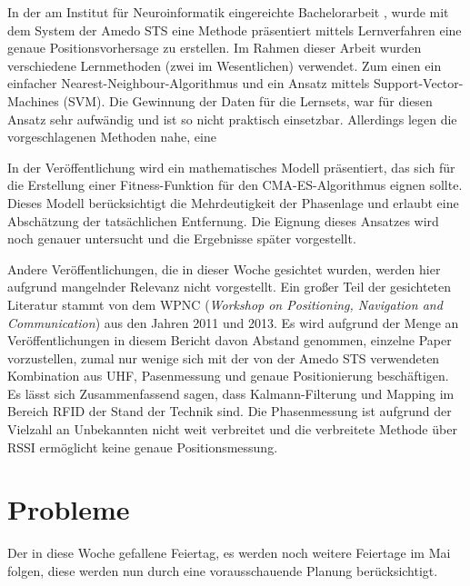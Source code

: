 \documentclass[a4paper,12pt,fleqn]{scrartcl}
\begin{document}
In der am Institut für Neuroinformatik eingereichte Bachelorarbeit \cite{Muz1}, wurde mit dem System der Amedo STS eine Methode präsentiert mittels Lernverfahren eine genaue Positionsvorhersage zu erstellen. Im Rahmen dieser Arbeit wurden verschiedene Lernmethoden (zwei im Wesentlichen) verwendet. Zum einen ein einfacher Nearest-Neighbour-Algorithmus und ein Ansatz mittels Support-Vector-Machines (SVM). Die Gewinnung der Daten für die Lernsets, war für diesen Ansatz sehr aufwändig und ist so nicht praktisch einsetzbar. Allerdings legen die vorgeschlagenen Methoden nahe, eine 

In der Veröffentlichung \cite{Wil1} wird ein mathematisches Modell präsentiert, das sich für die Erstellung einer Fitness-Funktion für den CMA-ES-Algorithmus eignen sollte. Dieses Modell berücksichtigt die Mehrdeutigkeit der Phasenlage und erlaubt eine Abschätzung der tatsächlichen Entfernung. Die Eignung dieses Ansatzes wird noch genauer untersucht und die Ergebnisse später vorgestellt.

Andere Veröffentlichungen, die in dieser Woche gesichtet wurden, werden hier aufgrund mangelnder Relevanz nicht vorgestellt. Ein großer Teil der gesichteten Literatur stammt von dem WPNC (\textit{Workshop on Positioning, Navigation and Communication}) aus den Jahren 2011 und 2013. Es wird aufgrund der Menge an Veröffentlichungen in diesem Bericht davon Abstand genommen, einzelne Paper vorzustellen, zumal nur wenige sich mit der von der Amedo STS verwendeten Kombination aus UHF, Pasenmessung und genaue Positionierung beschäftigen. Es lässt sich Zusammenfassend sagen, dass Kalmann-Filterung und Mapping im Bereich RFID der Stand der Technik sind. Die Phasenmessung ist aufgrund der Vielzahl an Unbekannten nicht weit verbreitet und die verbreitete Methode über RSSI ermöglicht keine genaue Positionsmessung.

\section[Probleme]{Probleme}
Der in diese Woche gefallene Feiertag, es werden noch weitere Feiertage im Mai folgen, diese werden nun durch eine vorausschauende Planung berücksichtigt.



\newpage


\end{document}
